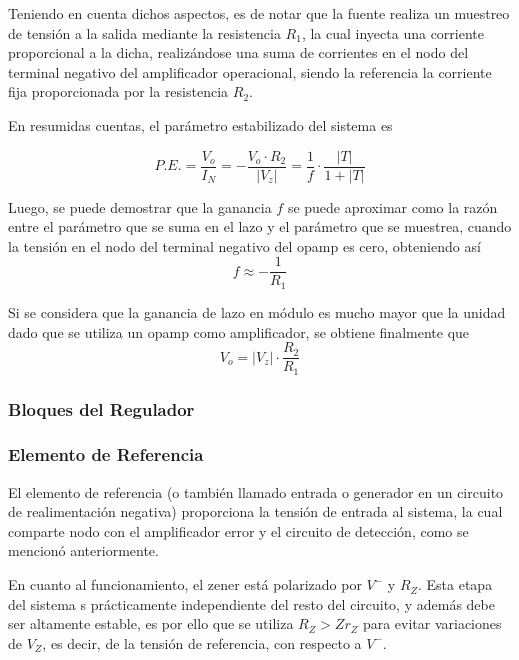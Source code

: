 Teniendo en cuenta dichos aspectos, es de notar que la fuente realiza un muestreo de tensión a la salida mediante la resistencia $R_1$, la cual inyecta una corriente proporcional a la dicha, realizándose una suma de corrientes en el nodo del terminal negativo del amplificador operacional, siendo la referencia la corriente fija proporcionada por la resistencia $R_2$.

En resumidas cuentas, el parámetro estabilizado del sistema es

\begin{equation}
P.E. = \frac{V_o}{I_N} = -\frac{V_o \cdot R_2}{|V_z|} = \frac{1}{f} \cdot \frac{|T|}{1 + |T|}
\end{equation}

Luego, se puede demostrar que la ganancia $f$ se puede aproximar como la razón entre el parámetro que se suma en el lazo y el parámetro que se muestrea, cuando la tensión en el nodo del terminal negativo del opamp es cero, obteniendo así
\begin{equation}
f \approx -\frac{1}{R_1}
\end{equation}

Si se considera que la ganancia de lazo en módulo es mucho mayor que la unidad dado que se utiliza un opamp como amplificador, se obtiene finalmente que
\begin{equation}
V_o = |V_z| \cdot \frac{R_2}{R_1}
\end{equation}

\subsubsection{Bloques del Regulador}
\subsubsection{Elemento de Referencia}
El elemento de referencia (o también llamado entrada o generador en un circuito de realimentación negativa) proporciona la tensión de entrada al sistema, la cual comparte nodo con el amplificador error y el circuito de detección, como se mencionó anteriormente.

En cuanto al funcionamiento, el zener está polarizado por $V^{-}$ y $R_Z$. Esta etapa del sistema s prácticamente independiente del resto del circuito, y además debe ser altamente estable, es por ello que se utiliza $R_Z >Z r_Z$ para evitar variaciones de $V_Z$, es decir, de la tensión de referencia, con respecto a $V^{-}$.

